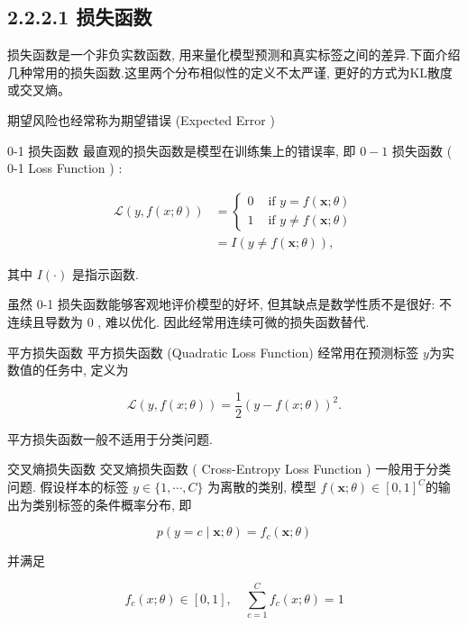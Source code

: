 \documentclass[10pt]{article}
\begin{document}
\subsection*{2.2.2.1 损失函数}
损失函数是一个非负实数函数, 用来量化模型预测和真实标签之间的差异.下面介绍几种常用的损失函数.这里两个分布相似性的定义不太严谨, 更好的方式为KL散度或交叉熵。

期望风险也经常称为期望错误 (Expected Error )

0-1 损失函数 最直观的损失函数是模型在训练集上的错误率, 即 $0-1$ 损失函数 ( 0-1 Loss Function ) :


\begin{align*}
\mathcal{L}(y, f(x ; \theta)) & = \begin{cases}0 & \text { if } y=f(\boldsymbol{x} ; \theta) \\
1 & \text { if } y \neq f(\boldsymbol{x} ; \theta)\end{cases}  \tag{2.12}\\
& =I(y \neq f(\boldsymbol{x} ; \theta)), \tag{2.13}
\end{align*}


其中 $I(\cdot)$ 是指示函数.

虽然 0-1 损失函数能够客观地评价模型的好坏, 但其缺点是数学性质不是很好: 不连续且导数为 0 , 难以优化. 因此经常用连续可微的损失函数替代.

平方损失函数 平方损失函数 (Quadratic Loss Function) 经常用在预测标签 $y$为实数值的任务中, 定义为


\begin{equation*}
\mathcal{L}(y, f(x ; \theta))=\frac{1}{2}(y-f(x ; \theta))^{2} . \tag{2.14}
\end{equation*}


平方损失函数一般不适用于分类问题.

交叉熵损失函数 交叉熵损失函数 ( Cross-Entropy Loss Function ) 一般用于分类问题. 假设样本的标签 $y \in\{1, \cdots, C\}$ 为离散的类别, 模型 $f(\boldsymbol{x} ; \theta) \in[0,1]^{C}$的输出为类别标签的条件概率分布, 即


\begin{equation*}
p(y=c \mid \boldsymbol{x} ; \theta)=f_{c}(\boldsymbol{x} ; \theta) \tag{2.15}
\end{equation*}


并满足


\begin{equation*}
f_{c}(x ; \theta) \in[0,1], \quad \sum_{c=1}^{C} f_{c}(x ; \theta)=1 \tag{2.16}
\end{equation*}
\end{document}
